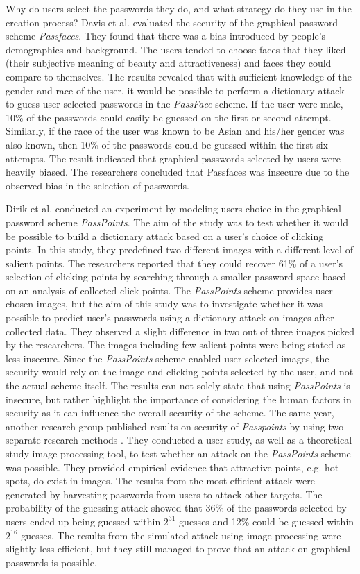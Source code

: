    Why do users select the passwords they do, and what strategy do they use in the creation process? Davis et al.\cite{Davis} evaluated the security of the graphical password scheme {\it Passfaces}. They found that there was a bias introduced by people's demographics and background. The users tended to choose faces that they liked (their subjective meaning of beauty and attractiveness) and faces they could compare to themselves. The results revealed that with sufficient knowledge of the gender and race of the user, it would be possible to perform a dictionary attack to guess user-selected passwords in the {\it PassFace} scheme. If the user were male, 10\% of the passwords could easily be guessed on the first or second attempt. Similarly, if the race of the user was known to be Asian and his/her gender was also known, then 10\% of the passwords could be guessed within the first six attempts. The result indicated that graphical passwords selected by users were heavily biased. The researchers concluded that Passfaces was insecure due to the observed bias in the selection of passwords. 

    Dirik et al. \cite{Dirik} conducted an experiment by modeling users choice in the graphical password scheme {\it PassPoints}. The aim of the study was to test whether it would be possible to build a dictionary attack based on a user's choice of clicking points. In this study, they predefined two different images with a different level of salient points. The researchers reported that they could recover 61\% of a user's selection of clicking points by searching through a smaller password space based on an analysis of collected click-points. The {\it PassPoints} scheme provides user-chosen images, but the aim of this study was to investigate whether it was possible to predict user's passwords using a dictionary attack on images after collected data. They observed a slight difference in two out of three images picked by the researchers. The images including few salient points were being stated as less insecure. Since the {\it PassPoints} scheme enabled user-selected images, the security would rely on the image and clicking points selected by the user, and not the actual scheme itself. The results can not solely state that using {\it PassPoints} is insecure, but rather highlight the importance of considering the human factors in security as it can influence the overall security of the scheme. The same year, another research group published results on security of {\it Passpoints} by using two separate research methods  \cite{Thorpe2}. They conducted a user study, as well as a theoretical study image-processing tool, to test whether an attack on the {\it PassPoints} scheme was possible. They provided empirical evidence that attractive points, e.g. hot-spots, do exist in images. The results from the most efficient attack were generated by harvesting passwords from users to attack other targets. The probability of the guessing attack showed that 36\% of the passwords selected by users ended up being guessed within $2^{31}$ guesses and 12\% could be guessed within $2^{16}$ guesses. The results from the simulated attack using image-processing were slightly less efficient, but they still managed to prove that an attack on graphical passwords is possible.
    
